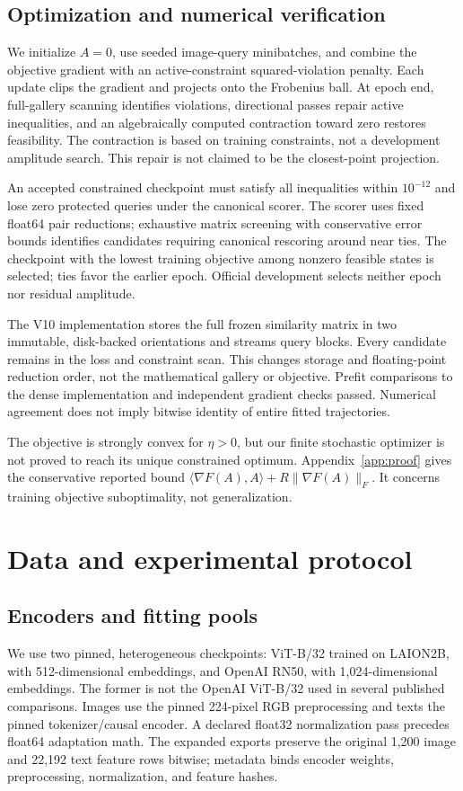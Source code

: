 \documentclass[11pt]{article}
\newcommand{\ip}[2]{\langle #1,#2\rangle}
\newcommand{\norm}[1]{\lVert #1\rVert}
\begin{document}
\subsection{Optimization and numerical verification}
We initialize $A=0$, use seeded image-query minibatches, and combine the
objective gradient with an active-constraint squared-violation penalty.
Each update clips the gradient and projects onto the Frobenius ball. At
epoch end, full-gallery scanning identifies violations, directional passes
repair active inequalities, and an algebraically computed contraction
toward zero restores feasibility. The contraction is based on training
constraints, not a development amplitude search. This repair is not claimed
to be the closest-point projection.

An accepted constrained checkpoint must satisfy all inequalities within
$10^{-12}$ and lose zero protected queries under the canonical scorer.
The scorer uses fixed float64 pair reductions; exhaustive matrix screening
with conservative error bounds identifies candidates requiring canonical
rescoring around near ties. The checkpoint with the lowest training
objective among nonzero feasible states is selected; ties favor the earlier
epoch. Official development selects neither epoch nor residual amplitude.

The V10 implementation stores the full frozen similarity matrix in two
immutable, disk-backed orientations and streams query blocks. Every
candidate remains in the loss and constraint scan. This changes storage
and floating-point reduction order, not the mathematical gallery or
objective. Prefit comparisons to the dense implementation and independent
gradient checks passed. Numerical agreement does not imply bitwise
identity of entire fitted trajectories.

The objective is strongly convex for $\eta>0$, but our finite stochastic
optimizer is not proved to reach its unique constrained optimum.
Appendix~\ref{app:proof} gives the conservative reported bound
$\ip{\nabla F(A)}{A}+R\norm{\nabla F(A)}_F$. It concerns training objective
suboptimality, not generalization.

\section{Data and experimental protocol}\label{sec:data}
\subsection{Encoders and fitting pools}
We use two pinned, heterogeneous checkpoints: ViT-B/32 trained on LAION2B,
with 512-dimensional embeddings, and OpenAI RN50, with 1,024-dimensional
embeddings. The former is not the OpenAI ViT-B/32 used in several published
comparisons. Images use the pinned 224-pixel RGB preprocessing and texts
the pinned tokenizer/causal encoder. A declared float32 normalization pass
precedes float64 adaptation math. The expanded exports preserve the original
1,200 image and 22,192 text feature rows bitwise; metadata binds encoder
weights, preprocessing, normalization, and feature hashes.
\end{document}
